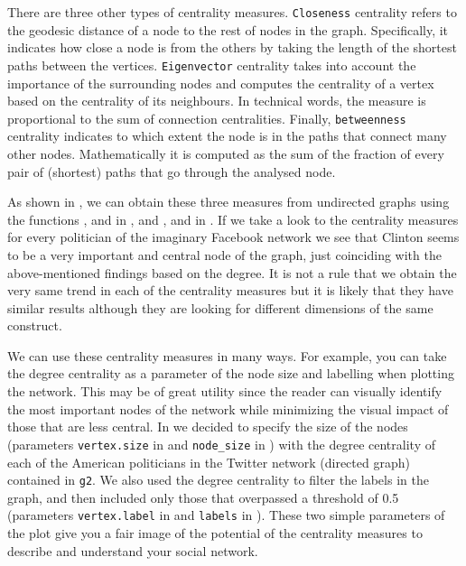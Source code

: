 
There are three other types of centrality measures. \texttt{Closeness} centrality refers to the geodesic distance of a node to the rest of nodes in the graph. Specifically, it indicates how close a node is from the others by taking the length of the shortest paths between the vertices. \texttt{Eigenvector} centrality takes into account the importance of the surrounding nodes and computes the centrality of a vertex based on the centrality of its neighbours. In technical words, the measure is proportional to the sum of connection centralities. Finally, \texttt{betweenness} centrality indicates to which extent the node is in the paths that connect many other nodes. Mathematically it is computed as the sum of the fraction of every pair of (shortest) paths that go through the analysed node. 

As shown in , we can obtain these three measures from undirected graphs using the functions ,  and  in , and ,  and  in . If we take a look to the centrality measures for every politician of the imaginary Facebook network we see that Clinton seems to be a very important and central node of the graph, just coinciding with the above-mentioned findings based on the degree. It is not a rule that we obtain the very same trend in each of the centrality measures but it is likely that they have similar results although they are looking for different dimensions of the same construct.


We can use these centrality measures in many ways. For example, you can take the degree centrality as a parameter of the node size and labelling when plotting the network. This may be of great utility since the reader can visually identify the most important nodes of the network while minimizing the visual impact of those that are less central. In  we decided to specify the size of the nodes (parameters \verb|vertex.size| in  and \verb|node_size| in ) with the degree centrality of each of the American politicians in the Twitter network (directed graph) contained in \texttt{g2}. We also used the degree centrality to filter the labels in the graph, and then included only those that overpassed a threshold of 0.5 (parameters \verb|vertex.label| in  and \verb|labels| in ). These two simple parameters of the plot give you a fair image of the potential of the centrality measures to describe and understand your social network.

